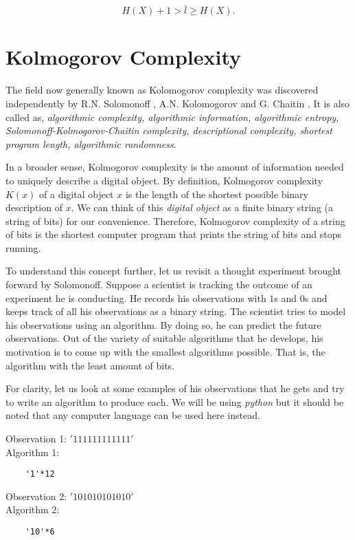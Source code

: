 \documentclass[]{article}
\begin{document}
$$H(X)+1 > \bar{l} \geq H(X).$$

\section{Kolmogorov Complexity}

The field now generally known as Kolomogorov complexity was discovered independently by R.N. Solomonoff \cite{solomonoff}, A.N. Kolomogorov \cite{kolmogorov} and G. Chaitin \cite{chaitin}. It is also called as, \emph{algorithmic complexity, algorithmic information,
algorithmic entropy, Solomonoff-Kolmogorov-Chaitin complexity, descriptional complexity,
shortest program length, algorithmic randomness}\cite{victor}. 

In a broader sense, Kolmogorov complexity is the amount of information needed to uniquely describe a digital object. By definition, Kolmogorov complexity $K(x)$ of a digital object $x$ is the length of the shortest possible binary description of $x$. We can think of this \emph{digital object} as a finite binary string (a string of bits) for our convenience. Therefore, Kolmogorov complexity of a string of bits is the shortest computer program that prints the string of bits and stops running. 

To understand this concept further, let us revisit a thought experiment brought forward by Solomonoff. Suppose a scientist is tracking the outcome of an experiment he is conducting. He records his observations with $1$s and $0$s and keeps track of all his observations as a binary string. The scientist tries to model his observations using an algorithm. By doing so, he can predict the future observations. Out of the variety of suitable algorithms that he develops, his motivation is to come up with the smallest algorithms possible. That is, the algorithm with the least amount of bits. 

For clarity, let us look at some examples of his observations that he gets and try to write an algorithm to produce each. We will be using \emph{python} but it should be noted that any computer language can be used here instead. 

\vspace{10pt}
\noindent Observation 1: $'111111111111'$ \\
Algorithm 1: 
\vspace*{-3mm}
\begin{verbatim}
	'1'*12
\end{verbatim}

\vspace{5pt}
\noindent Observation 2: $'101010101010'$ \\
Algorithm 2: 
\vspace*{-3mm}
\begin{verbatim}
	'10'*6
\end{verbatim}
\end{document}
